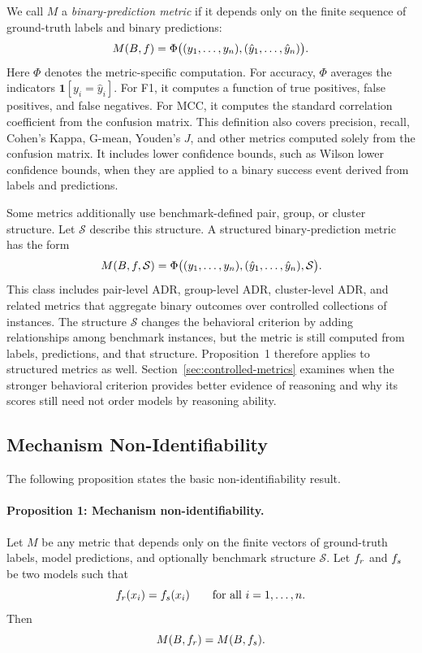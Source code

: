 \documentclass[acmsmall,screen,review,anonymous]{acmart}
\begin{document}
We call \(M\) a \emph{binary-prediction metric} if it depends only on the
finite sequence of ground-truth labels and binary predictions:
\[
M(B,f)
=
\Phi\big(
(y_1,\ldots,y_n),
(\hat{y}_1,\ldots,\hat{y}_n)
\big).
\]
Here \(\Phi\) denotes the metric-specific computation. For accuracy,
\(\Phi\) averages the indicators
\(\mathbf{1}[y_i=\hat{y}_i]\). For F1, it computes a function of true
positives, false positives, and false negatives. For MCC, it computes the
standard correlation coefficient from the confusion matrix. This definition
also covers precision, recall, Cohen's Kappa, G-mean, Youden's \(J\), and
other metrics computed solely from the confusion matrix. It includes lower
confidence bounds, such as Wilson lower confidence bounds, when they are
applied to a binary success event derived from labels and predictions.

Some metrics additionally use benchmark-defined pair, group, or cluster
structure. Let \(\mathcal{S}\) describe this structure. A structured
binary-prediction metric has the form
\[
M(B,f,\mathcal{S})
=
\Phi\big(
(y_1,\ldots,y_n),
(\hat{y}_1,\ldots,\hat{y}_n),
\mathcal{S}
\big).
\]
This class includes pair-level ADR, group-level ADR, cluster-level ADR, and
related metrics that aggregate binary outcomes over controlled collections of
instances. The structure \(\mathcal{S}\) changes the behavioral criterion by
adding relationships among benchmark instances, but the metric is still
computed from labels, predictions, and that structure. Proposition~1
therefore applies to structured metrics as well. Section~\ref{sec:controlled-metrics}
examines when the stronger behavioral criterion provides better evidence of
reasoning and why its scores still need not order models by reasoning ability.

\subsection{Mechanism Non-Identifiability}

The following proposition states the basic non-identifiability result.

\paragraph{Proposition 1: Mechanism non-identifiability.}
Let \(M\) be any metric that depends only on the finite vectors of
ground-truth labels, model predictions, and optionally benchmark structure
\(\mathcal{S}\). Let \(f_r\) and \(f_s\) be two models such that
\[
f_r(x_i)=f_s(x_i)
\qquad
\text{for all } i=1,\ldots,n.
\]
Then
\[
M(B,f_r)=M(B,f_s).
\]
\end{document}
